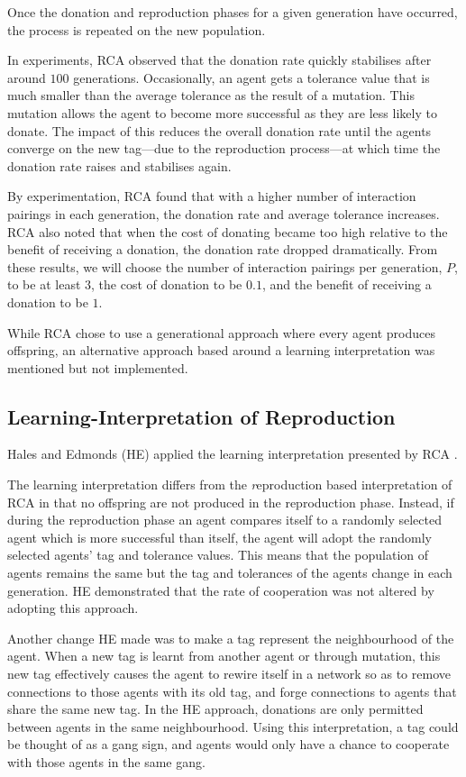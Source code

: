 Once the donation and reproduction phases for a given generation
have occurred, the process is repeated on the new population.

In experiments, RCA observed that the donation rate quickly stabilises after around
$100$ generations.  Occasionally, an agent gets a tolerance value
that is much smaller than the average tolerance as the result of a
mutation.  This mutation allows the agent to become more successful
as they are less likely to donate.  The impact of this reduces the
overall donation rate until the agents converge on the new tag---due
to the reproduction process---at which time the donation rate raises
and stabilises again.

By experimentation, RCA found that with a higher number of interaction
pairings in each generation, the donation rate and average tolerance
increases.  RCA also noted that when the cost of donating became
too high relative to the benefit of receiving a donation, the
donation rate dropped dramatically.  From these results, we will
choose the number of interaction pairings per generation, $P$, to
be at least $3$, the cost of donation to be $0.1$, and the benefit
of receiving a donation to be $1$.

While RCA chose to use a generational approach where every agent produces offspring,
an alternative approach based around a learning interpretation was mentioned but not implemented.

\subsection{Learning-Interpretation of Reproduction}

Hales and Edmonds (HE) applied the learning interpretation presented by RCA \cite{he}.

The learning interpretation differs from the {\emph reproduction} based interpretation of RCA
in that no offspring are not produced in the reproduction phase.
Instead, if during the reproduction phase an agent compares itself to a randomly selected agent which is more successful than itself, the agent will adopt the randomly selected agents' tag and tolerance values.
This means that the population of agents remains the same but the tag and tolerances of the agents change in each generation.
HE demonstrated that the rate of cooperation was not altered by adopting this approach.

Another change HE made was to make a tag represent the neighbourhood of the agent.
When a new tag is learnt from another agent or through mutation,
this new tag effectively causes the agent to rewire itself in a network so as to remove connections to those agents with its old tag,
and forge connections to agents that share the same new tag.
In the HE approach, donations are only permitted between agents in the same neighbourhood.
Using this interpretation, a tag could be thought of as a gang sign, and agents would only have a chance to cooperate with those agents in the same gang.

